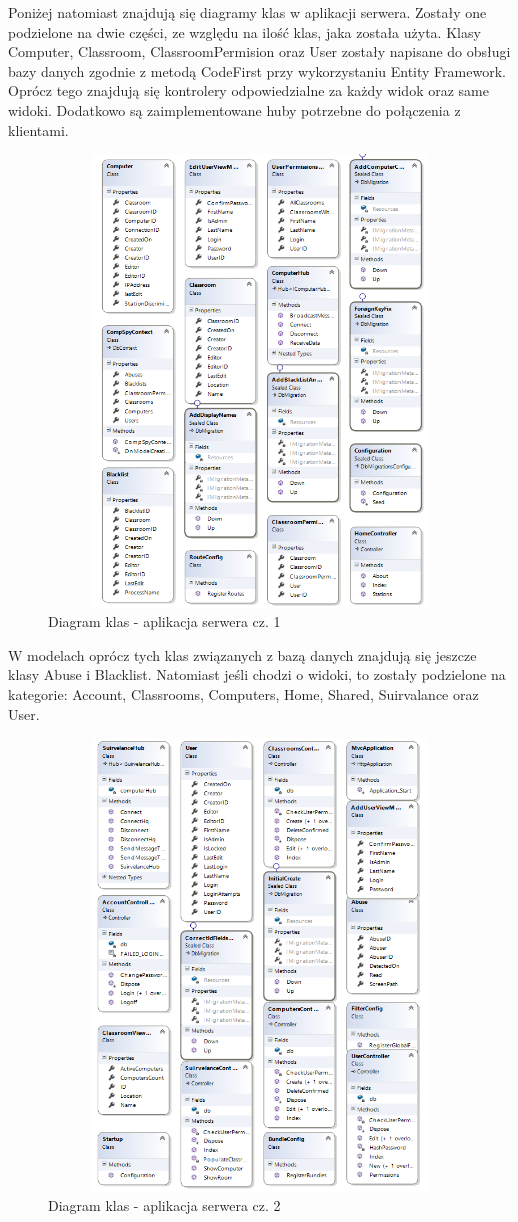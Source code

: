 Poniżej natomiast znajdują się diagramy klas w aplikacji serwera. Zostały one podzielone na dwie części, ze względu na ilość klas, jaka została użyta. Klasy Computer, Classroom, ClassroomPermision oraz User zostały napisane do obsługi bazy danych zgodnie z metodą CodeFirst przy wykorzystaniu Entity Framework. Oprócz tego znajdują się kontrolery odpowiedzialne za każdy widok oraz same widoki. Dodatkowo są zaimplementowane huby potrzebne do połączenia z klientami.

\begin{figure} [!ht]
    \centering
    \includegraphics[height=12cm,width=12cm]{diagramklas_serwer1}
    \caption{Diagram klas - aplikacja serwera cz. 1}
    \label{fig:my_label}
\end{figure}
\newpage
W modelach oprócz tych klas związanych z bazą danych znajdują się jeszcze klasy Abuse i Blacklist. Natomiast jeśli chodzi o widoki, to zostały podzielone na kategorie: Account, Classrooms, Computers, Home, Shared, Suirvalance oraz User.

\begin{figure} [!ht]
    \centering
    \includegraphics[height=12cm,width=12cm]{diagramklas_serwer2}
    \caption{Diagram klas - aplikacja serwera cz. 2}
    \label{fig:my_label}
\end{figure}